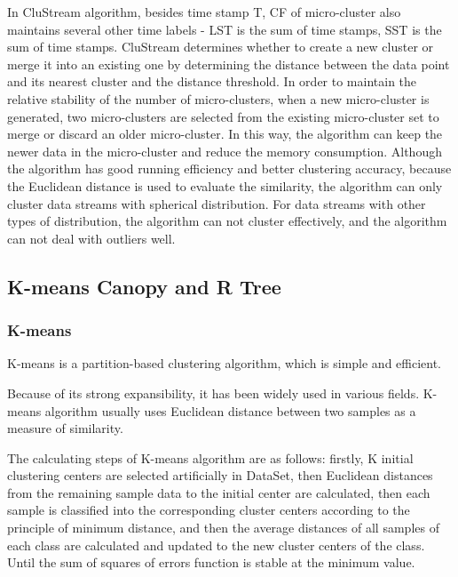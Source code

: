 \documentclass[runningheads]{llncs}
\begin{document}
In CluStream algorithm, besides time stamp T, CF of micro-cluster also maintains several other time labels - LST is the sum of time stamps, SST is the sum of time stamps. CluStream determines whether to create a new cluster or merge it into an existing one by determining the distance between the data point and its nearest cluster and the distance threshold. In order to maintain the relative stability of the number of micro-clusters, when a new micro-cluster is generated, two micro-clusters are selected from the existing micro-cluster set to merge or discard an older micro-cluster. In this way, the algorithm can keep the newer data in the micro-cluster and reduce the memory consumption. Although the algorithm has good running efficiency and better clustering accuracy, because the Euclidean distance is used to evaluate the similarity, the algorithm can only cluster data streams with spherical distribution. For data streams with other types of distribution, the algorithm can not cluster effectively, and the algorithm can not deal with outliers well.
\subsection{K-means Canopy and R Tree}
\subsubsection{K-means}
K-means is a partition-based clustering algorithm, which is simple and efficient.

Because of its strong expansibility, it has been widely used in various fields. K-means algorithm usually uses Euclidean distance between two samples as a measure of similarity.

The calculating steps of K-means algorithm are as follows: firstly, K initial clustering centers are selected artificially in DataSet, then Euclidean distances from the remaining sample data to the initial center are calculated, then each sample is classified into the corresponding cluster centers according to the principle of minimum distance, and then the average distances of all samples of each class are calculated and updated to the new cluster centers of the class. Until the sum of squares of errors function is stable at the minimum value.
\end{document}
